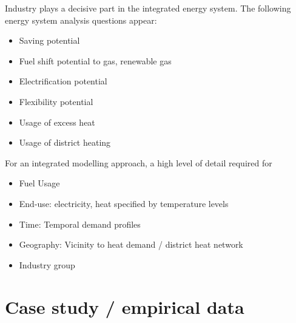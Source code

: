 \documentclass[review]{elsarticle}
\begin{document}
Industry plays a decisive part in the integrated energy system. The following energy system analysis questions appear:
\begin{itemize}
    \item Saving potential
    \item Fuel shift potential to gas, renewable gas
    \item Electrification potential
    \item Flexibility potential
    \item Usage of excess heat
    \item Usage of district heating
\end{itemize}
For an integrated modelling approach, a high level of detail required for
\begin{itemize}
    \item Fuel Usage
    \item End-use: electricity, heat specified by temperature levels
    \item Time: Temporal demand profiles
    \item Geography: Vicinity to heat demand / district heat network
    \item Industry group
\end{itemize} 


\section{Case study / empirical data} \label{datadescr}
\end{document}
